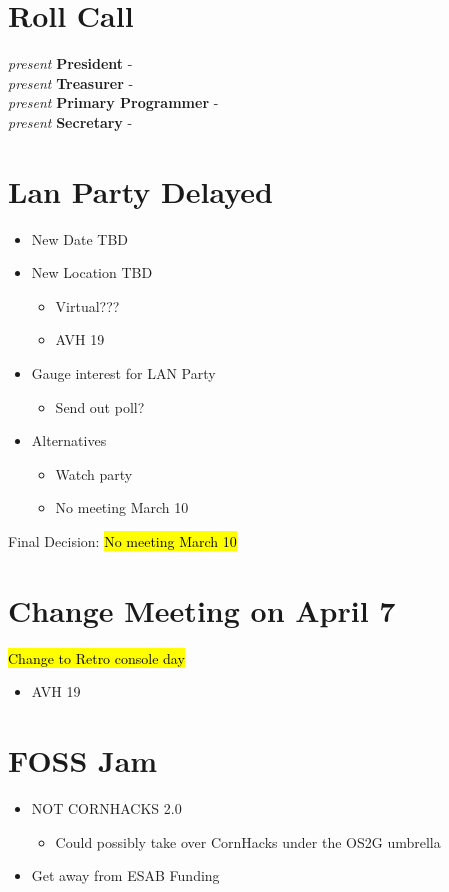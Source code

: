 \section*{Roll Call}

\noindent \emph{present} \textbf{President} - \president \\
\emph{present} \textbf{Treasurer} - \treasurer \\
\emph{present} \textbf{Primary Programmer} - \primaryprogrammer \\
\emph{present} \textbf{Secretary} - \secretary \\

\section*{Lan Party Delayed}
   \begin{itemize}
       \item New Date TBD
       \item New Location TBD
       \begin{itemize}
           \item Virtual???
           \item AVH 19
       \end{itemize}
       \item Gauge interest for LAN Party
       \begin{itemize}
           \item Send out poll?
       \end{itemize}
       \item Alternatives
       \begin{itemize}
           \item Watch party
           \item No meeting March 10
       \end{itemize}
   \end{itemize}
Final Decision: \hl{No meeting March 10}

\section*{Change Meeting on April 7}
\hl{Change to Retro console day}
   \begin{itemize}
       \item AVH 19
   \end{itemize}

\section*{FOSS Jam}
   \begin{itemize}
       \item NOT CORNHACKS 2.0
       \begin{itemize}
            \item Could possibly take over CornHacks under the OS2G umbrella
        \end{itemize}
       \item Get away from ESAB Funding
   \end{itemize}

